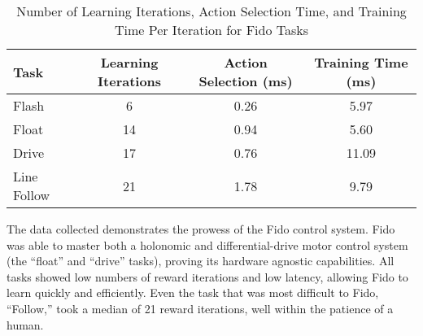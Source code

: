 \begin{table}[ht]
	\centering
	\begin{tabular}{@{}lccc@{}}
		\toprule
		Task        & Learning Iterations & Action Selection (ms) & Training Time (ms) \\ \midrule
		Flash       & 6                   & 0.26                  & 5.97               \\
		Float       & 14                  & 0.94                  & 5.60               \\
		Drive       & 17                  & 0.76                  & 11.09              \\
		Line Follow & 21                  & 1.78                  & 9.79               \\ \bottomrule
	\end{tabular}
	\caption{Number of Learning Iterations, Action Selection Time, and Training Time Per Iteration for Fido Tasks}
	\label{tab:data}
\end{table}

The data collected demonstrates the prowess of the Fido control system.   Fido was able to master both a holonomic and differential-drive motor control system (the ``float'' and ``drive'' tasks), proving its hardware agnostic capabilities.  All tasks showed low numbers of reward iterations and low latency, allowing Fido to learn quickly and efficiently. Even the task that was most difficult to Fido, ``Follow,'' took a median of 21 reward iterations, well within the patience of a human.

